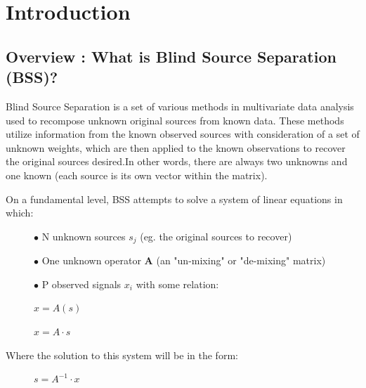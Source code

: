 \documentclass[12pt,twoside]{amherstthesis}
\begin{document}
  \chapter*{Introduction}\label{introduction}
  
  \section{Overview : What is Blind Source Separation
  (BSS)?}\label{overview-what-is-blind-source-separation-bss}
  
  Blind Source Separation is a set of various methods in multivariate data
  analysis used to recompose unknown original sources from known data.
  These methods utilize information from the known observed sources with
  consideration of a set of unknown weights, which are then applied to the
  known observations to recover the original sources desired.In other
  words, there are always two unknowns and one known (each source is its
  own vector within the matrix).
  
  On a fundamental level, BSS attempts to solve a system of linear
  equations in which:
  
  \begin{figure}[h]
    
  
    $\bullet$ N unknown sources $s_j$ (eg. the original sources to recover) \newline
    
    
    $\bullet$ One unknown operator $\textbf{A}$ (an "un-mixing" or "de-mixing" matrix) \newline
    
    
    $\bullet$ P observed signals $x_i$ with some relation: \newline
    
    \centering $\textbf{$x = A(s)$}$
  
  \end{figure}
  
  \begin{figure}[h]
    
    \centering
  $x = A\cdot s$ 
  
  \end{figure}
  
  Where the solution to this system will be in the form:
  
  \begin{figure}[h]
    
    \centering
  $s = A^{-1}\cdot x$
  \end{figure}
  
\end{document}
